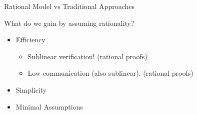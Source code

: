 \begin{frame}{Rational Model vs Traditional Approaches}
	\begin{block}{What do we gain by assuming rationality?}
		\begin{itemize}[<+- | alert@+>]
			\item Efficiency
			\begin{itemize}
				\item Sublinear verification! (rational proofs)
				\item Low communication (also sublinear). (rational proofs)
			\end{itemize}
			\item Simplicity
			\item Minimal Assumptions
		\end{itemize}
	\end{block}
	
\end{frame}




